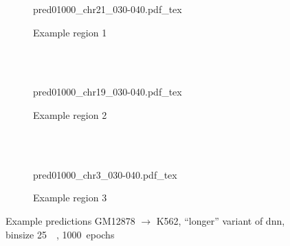 \begin{figure}[p]
    \begin{subfigure}{\textwidth}
        \centering
        \scriptsize
        {pred01000_chr21_030-040.pdf_tex}
        \caption{Example  region 1} \label{fig:results:longer_r1}
    \end{subfigure}\\[2mm]
    \\[3mm]
    \begin{subfigure}{\textwidth}
        \centering
        \scriptsize
        {pred01000_chr19_030-040.pdf_tex}
        \caption{Example region 2} \label{fig:results:longer_r2}
    \end{subfigure}\\[2mm]
    \\[3mm]
    \begin{subfigure}{\textwidth}
        \centering
        \scriptsize
        {pred01000_chr3_030-040.pdf_tex}
        \caption{Example region 3} \label{fig:results:longer_r3}
    \end{subfigure}
    \caption{Example predictions GM12878 $\rightarrow$ K562, ``longer'' variant of \acrshort{dnn},\\binsize \SI{25}{\kilo\bp}, 1000~epochs} \label{fig:results:longer_matrices}
\end{figure}

